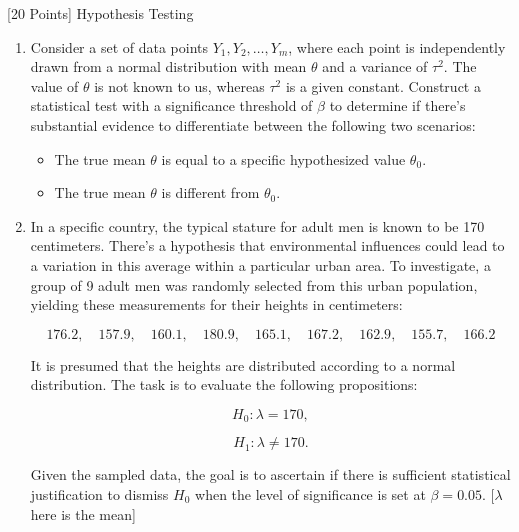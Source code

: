 [20 Points] Hypothesis Testing

\begin{enumerate}
    \item 

Consider a set of data points \( Y_1, Y_2, \ldots, Y_m \), where each point is independently drawn from a normal distribution with mean \( \theta \) and a variance of \( \tau^2 \). The value of \( \theta \) is not known to us, whereas \( \tau^2 \) is a given constant. Construct a statistical test with a significance threshold of \( \beta \) to determine if there's substantial evidence to differentiate between the following two scenarios:

\begin{itemize}
\item The true mean \( \theta \) is equal to a specific hypothesized value \( \theta_0 \).
\item The true mean \( \theta \) is different from \( \theta_0 \).
\end{itemize}

    \item

In a specific country, the typical stature for adult men is known to be 170 centimeters. There's a hypothesis that environmental influences could lead to a variation in this average within a particular urban area. To investigate, a group of 9 adult men was randomly selected from this urban population, yielding these measurements for their heights in centimeters:

\[
176.2, \quad 157.9, \quad 160.1, \quad 180.9, \quad 165.1, \quad 167.2, \quad 162.9, \quad 155.7, \quad 166.2
\]

It is presumed that the heights are distributed according to a normal distribution. The task is to evaluate the following propositions:

\[
H_0: \lambda = 170,
\]

\[
H_1: \lambda \neq 170.
\]

Given the sampled data, the goal is to ascertain if there is sufficient statistical justification to dismiss \( H_0 \) when the level of significance is set at \( \beta = 0.05 \). [\(\lambda\) here is the mean]



\end{enumerate}